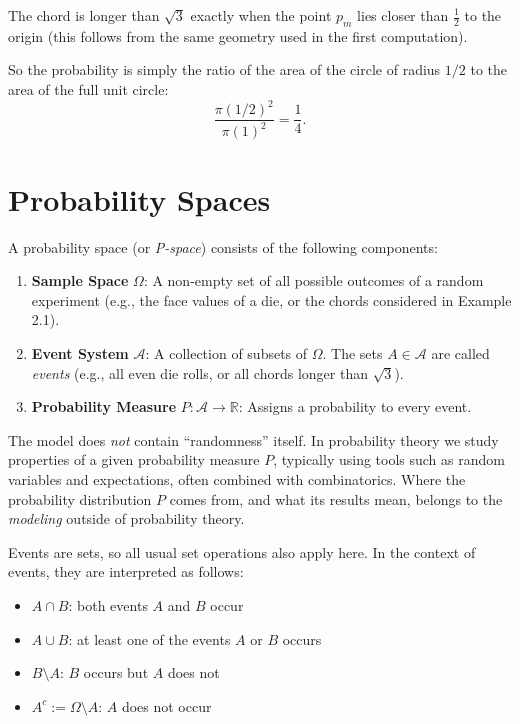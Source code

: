\documentclass{article}
\begin{document}
The chord is longer than $\sqrt{3}$ exactly when the point $p_m$ lies closer than $\tfrac{1}{2}$ to the origin (this follows from the same geometry used in the first computation).  

So the probability is simply the ratio of the area of the circle of radius $1/2$ to the area of the full unit circle:
\[
\frac{\pi (1/2)^2}{\pi (1)^2} = \frac{1}{4}.
\]\section{Probability Spaces}

A probability space (or \emph{P-space}) consists of the following components:

\begin{enumerate}
    \item \textbf{Sample Space} $\Omega$:  
    A non-empty set of all possible outcomes of a random experiment  
    (e.g., the face values of a die, or the chords considered in Example 2.1).

    \item \textbf{Event System} $\mathcal{A}$:  
    A collection of subsets of $\Omega$.  
    The sets $A \in \mathcal{A}$ are called \emph{events}  
    (e.g., all even die rolls, or all chords longer than $\sqrt{3}$).

    \item \textbf{Probability Measure} $P : \mathcal{A} \to \mathbb{R}$:  
    Assigns a probability to every event.
\end{enumerate}

The model does \emph{not} contain “randomness” itself.  
In probability theory we study properties of a given probability measure $P$, 
typically using tools such as random variables and expectations, often combined with combinatorics.  
Where the probability distribution $P$ comes from, and what its results mean, belongs to the 
\emph{modeling} outside of probability theory.

Events are sets, so all usual set operations also apply here.  
In the context of events, they are interpreted as follows:

\begin{itemize}
    \item $A \cap B$: both events $A$ and $B$ occur
    \item $A \cup B$: at least one of the events $A$ or $B$ occurs
    \item $B \setminus A$: $B$ occurs but $A$ does not
    \item $A^c := \Omega \setminus A$: $A$ does not occur
\end{itemize}
\end{document}
